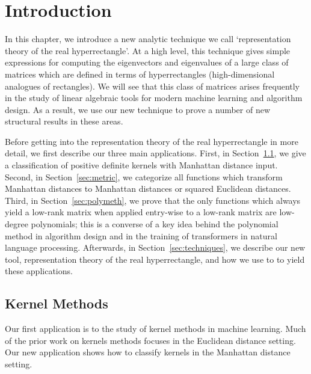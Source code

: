 
\section{Introduction} 

In this chapter, we introduce a new analytic technique we call `representation theory of the real hyperrectangle'. At a high level, this technique gives simple expressions for computing the eigenvectors and eigenvalues of a large class of matrices which are defined in terms of hyperrectangles (high-dimensional analogues of rectangles). We will see that this class of matrices arises frequently in the study of linear algebraic tools for modern machine learning and algorithm design. As a result, we use our new technique to prove a number of new structural results in these areas.

Before getting into the representation theory of the real hyperrectangle in more detail, we first describe our three main applications. First, in Section~\ref{sec:kernel}, we give a classification of positive definite kernels with Manhattan distance input. Second, in Section~\ref{sec:metric}, we categorize all functions which transform Manhattan distances to Manhattan distances or squared Euclidean distances. Third, in Section~\ref{sec:polymeth}, we prove that the only functions which always yield a low-rank matrix when applied entry-wise to a low-rank matrix are low-degree polynomials; this is a converse of a key idea behind the polynomial method in algorithm design and in the training of transformers in natural language processing. Afterwards, in Section~\ref{sec:techniques}, we describe our new tool, representation theory of the real hyperrectangle, and how we use to to yield these applications.



\subsection{Kernel Methods}\label{sec:kernel}
Our first application is to the study of kernel methods in machine learning. Much of the prior work on kernels methods focuses in the Euclidean distance setting. Our new application shows how to classify kernels in the Manhattan distance setting.

